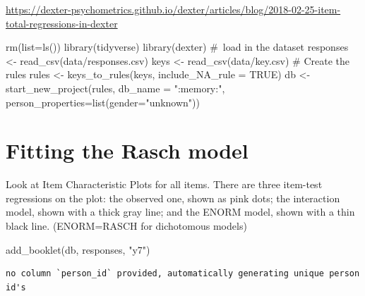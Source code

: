 \documentclass[
  letterpaper,
  DIV=11,
  numbers=noendperiod]{scrreprt}
\newenvironment{Shaded}{\begin{snugshade}}{\end{snugshade}}
\newcommand{\AttributeTok}[1]{\textcolor[rgb]{0.40,0.45,0.13}{#1}}
\newcommand{\CommentTok}[1]{\textcolor[rgb]{0.37,0.37,0.37}{#1}}
\newcommand{\ConstantTok}[1]{\textcolor[rgb]{0.56,0.35,0.01}{#1}}
\newcommand{\FunctionTok}[1]{\textcolor[rgb]{0.28,0.35,0.67}{#1}}
\newcommand{\NormalTok}[1]{\textcolor[rgb]{0.00,0.23,0.31}{#1}}
\newcommand{\OtherTok}[1]{\textcolor[rgb]{0.00,0.23,0.31}{#1}}
\newcommand{\StringTok}[1]{\textcolor[rgb]{0.13,0.47,0.30}{#1}}
\begin{document}
\url{https://dexter-psychometrics.github.io/dexter/articles/blog/2018-02-25-item-total-regressions-in-dexter}

\begin{Shaded}
\begin{Highlighting}[]
\FunctionTok{rm}\NormalTok{(}\AttributeTok{list=}\FunctionTok{ls}\NormalTok{())}
\FunctionTok{library}\NormalTok{(tidyverse)}
\FunctionTok{library}\NormalTok{(dexter)}
\CommentTok{\# load in the dataset}
\NormalTok{responses }\OtherTok{\textless{}{-}} \FunctionTok{read\_csv}\NormalTok{(}\StringTok{\textquotesingle{}data/responses.csv\textquotesingle{}}\NormalTok{)}
\NormalTok{keys }\OtherTok{\textless{}{-}} \FunctionTok{read\_csv}\NormalTok{(}\StringTok{\textquotesingle{}data/key.csv\textquotesingle{}}\NormalTok{)}
\CommentTok{\# Create the rules}
\NormalTok{rules }\OtherTok{\textless{}{-}} \FunctionTok{keys\_to\_rules}\NormalTok{(keys, }\AttributeTok{include\_NA\_rule =} \ConstantTok{TRUE}\NormalTok{)}
\NormalTok{db }\OtherTok{\textless{}{-}} \FunctionTok{start\_new\_project}\NormalTok{(rules, }\AttributeTok{db\_name =} \StringTok{":memory:"}\NormalTok{, }\AttributeTok{person\_properties=}\FunctionTok{list}\NormalTok{(}\AttributeTok{gender=}\StringTok{"unknown"}\NormalTok{))}
\end{Highlighting}
\end{Shaded}

\hypertarget{fitting-the-rasch-model}{%
\section{Fitting the Rasch model}\label{fitting-the-rasch-model}}

Look at Item Characteristic Plots for all items. There are three
item-test regressions on the plot: the observed one, shown as pink dots;
the interaction model, shown with a thick gray line; and the ENORM
model, shown with a thin black line. (ENORM=RASCH for dichotomous
models)

\begin{Shaded}
\begin{Highlighting}[]
\FunctionTok{add\_booklet}\NormalTok{(db, responses, }\StringTok{"y7"}\NormalTok{) }
\end{Highlighting}
\end{Shaded}

\begin{verbatim}
no column `person_id` provided, automatically generating unique person id's
\end{verbatim}
\end{document}

